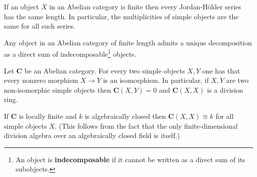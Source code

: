     \begin{theorem}
        If an object $X$ in an Abelian category is finite then every Jordan-H\"older series has the same length. In particular, the multiplicities of simple objects are the same for all such series.
    \end{theorem}
    \begin{theorem}
        Any object in an Abelian category of finite length admits a unique decomposition as a direct sum of indecomposable\footnote{An object is \textbf{indecomposable} if it cannot be written as a direct sum of its subobjects.} objects.
    \end{theorem}


    \begin{theorem}
        Let $\mathbf{C}$ be an Abelian category. For every two simple objects $X, Y$ one has that every nonzero morphism $X\rightarrow Y$ is an isomorphism. In particular, if $X, Y$ are two non-isomorphic simple objects then $\mathbf{C}(X, Y)=0$ and $\mathbf{C}(X, X)$ is a division ring.
    \end{theorem}
    \begin{result}
        If $\mathbf{C}$ is locally finite and $k$ is algebraically closed then $\mathbf{C}(X, X)\cong k$ for all simple objects $X$. (This follows from the fact that the only finite-dimensional division algebra over an algebraically closed field is itself.)
    \end{result}

